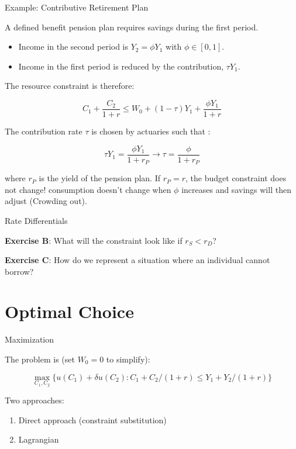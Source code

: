 \documentclass[handout]{beamer}
\begin{document}
\begin{frame}{Example: Contributive Retirement Plan}

A defined benefit pension plan requires savings during the first period. 
\begin{itemize}

\item Income in the second period is $Y_2 = \phi Y_1$ with $\phi \in [0,1]$. 
\item Income in the first period is reduced by the contribution, $\tau Y_1$. 

\end{itemize}

The resource constraint is therefore: 

$$ C_1 + \frac{C_2}{1+r} \leq W_0 + (1-\tau)Y_1 + \frac{\phi Y_1}{1+r}  $$

The contribution rate $\tau$ is chosen by actuaries such that : 

$$ \tau Y_1 = \frac{\phi Y_1}{1+r_P} \to \tau = \frac{\phi}{1+r_P} $$

where $r_P$ is the yield of the pension plan. If $r_P = r$, the budget constraint does not change! consumption doesn't change when $\phi$ increases and savings will then adjust (Crowding out).

\end{frame}

\begin{frame}{Rate Differentials}

\textbf{Exercise B}: What will the constraint look like if $r_S<r_D$?

\textbf{Exercise C}: How do we represent a situation where an individual cannot borrow?

\end{frame}

\section{Optimal Choice}

\begin{frame}{Maximization}

The problem is (set $W_0=0$ to simplify):

$$ \max_{C_1,C_2} \{ u(C_1) + \delta u(C_2) : C_1+C_2/(1+r) \leq Y_1 + Y_2/(1+r)\}  $$

Two approaches: 
\begin{enumerate}
\item Direct approach (constraint substitution)
\item Lagrangian	
\end{enumerate}


\end{frame}
\end{document}
